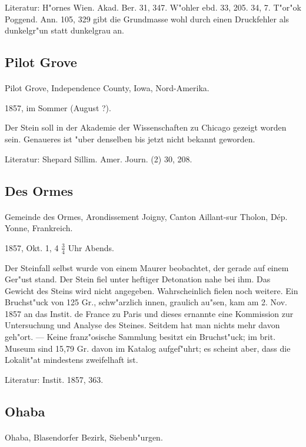 \documentclass[a4paper, 11pt, oneside]{article}
\begin{document}
Literatur: H"ornes Wien. Akad. Ber. 31, 347. W"ohler ebd. 33, 205. 34, 7. T"or"ok Poggend. Ann. 105, 329 gibt die Grundmasse wohl durch einen Druckfehler als dunkelgr"un statt dunkelgrau an.

\subsection{Pilot Grove}
\normalsize
\paragraph{}
Pilot Grove, Independence County, Iowa, Nord-Amerika.

1857, im Sommer (August ?).

Der Stein soll in der Akademie der Wissenschaften zu Chicago gezeigt worden sein. Genaueres ist "uber denselben bis jetzt nicht bekannt geworden.

Literatur: Shepard Sillim. Amer. Journ. (2) 30, 208.

\subsection{Des Ormes}
\normalsize
\paragraph{}
Gemeinde des Ormes, Arondissement Joigny, Canton Aillant-sur Tholon, Dép. Yonne, Frankreich.

1857, Okt. 1, 4 $\frac{3}{4}$ Uhr Abends.

Der Steinfall selbst wurde von einem Maurer beobachtet, der gerade auf einem Ger"ust stand. Der Stein fiel unter heftiger Detonation nahe bei ihm. Das Gewicht des Steins wird nicht angegeben. Wahrscheinlich fielen noch weitere. Ein Bruchst"uck von 125 Gr., schw"arzlich innen, graulich au"sen, kam am 2. Nov. 1857 an das Instit. de France zu Paris und dieses ernannte eine Kommission zur Untersuchung und Analyse des Steines. Seitdem hat man nichts mehr davon geh"ort. --- Keine franz"osische Sammlung besitzt ein Bruchst"uck; im brit. Museum sind 15,79 Gr. davon im Katalog aufgef"uhrt; es scheint aber, dass die Lokalit"at mindestens zweifelhaft ist.

Literatur: Instit. 1857, 363.

\subsection{Ohaba}
\normalsize
\paragraph{}
Ohaba, Blasendorfer Bezirk, Siebenb"urgen.
\end{document}
